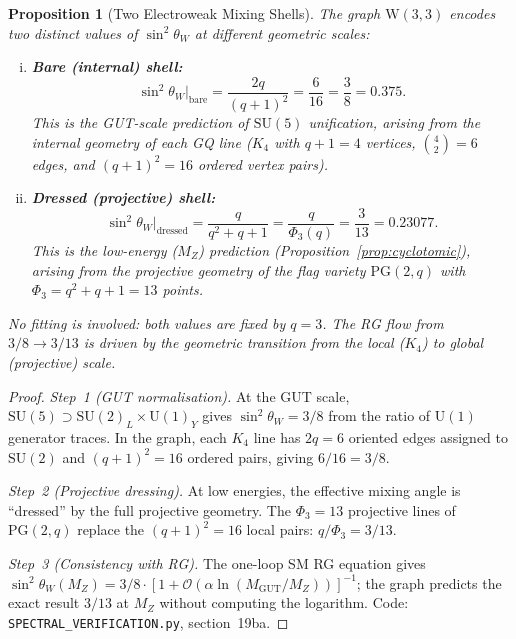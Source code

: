 \documentclass[12pt,a4paper]{article}
\newtheorem{proposition}[theorem]{Proposition}
\newcommand{\W}{\mathrm{W}(3,3)}
\begin{document}
\begin{proposition}[Two Electroweak Mixing Shells]\label{prop:ew-shells}
The graph $\W$ encodes \emph{two} distinct values of $\sin^2\theta_W$
at different geometric scales:
\begin{enumerate}[(i)]
  \item \textbf{Bare (internal) shell:}
        \[
          \sin^2\theta_W\big|_{\mathrm{bare}}
          = \frac{2q}{(q+1)^2}
          = \frac{6}{16}
          = \frac{3}{8}
          = 0.375.
        \]
        This is the GUT-scale prediction of $\mathrm{SU}(5)$
        unification, arising from the \emph{internal} geometry of
        each GQ line ($K_4$ with $q+1 = 4$ vertices, $\binom{4}{2} = 6$ edges,
        and $(q+1)^2 = 16$ ordered vertex pairs).
  \item \textbf{Dressed (projective) shell:}
        \[
          \sin^2\theta_W\big|_{\mathrm{dressed}}
          = \frac{q}{q^2 + q + 1}
          = \frac{q}{\Phi_3(q)}
          = \frac{3}{13}
          = 0.23077.
        \]
        This is the low-energy ($M_Z$) prediction
        (Proposition~\ref{prop:cyclotomic}), arising from the
        \emph{projective} geometry of the flag variety
        $\mathrm{PG}(2,q)$ with $\Phi_3 = q^2+q+1 = 13$ points.
\end{enumerate}
No fitting is involved: both values are fixed by $q = 3$.
The RG flow from $3/8 \to 3/13$ is driven by the geometric
transition from the local ($K_4$) to global (projective) scale.
\end{proposition}

\begin{proof}
\emph{Step~1 (GUT normalisation).}
At the GUT scale, $\mathrm{SU}(5) \supset \mathrm{SU}(2)_L \times \mathrm{U}(1)_Y$
gives $\sin^2\theta_W = 3/8$ from the ratio of $\mathrm{U}(1)$
generator traces.  In the graph, each $K_4$ line has $2q = 6$
oriented edges assigned to $\mathrm{SU}(2)$ and $(q+1)^2 = 16$
ordered pairs, giving $6/16 = 3/8$.

\emph{Step~2 (Projective dressing).}
At low energies, the effective mixing angle is ``dressed'' by
the full projective geometry.  The $\Phi_3 = 13$ projective lines
of $\mathrm{PG}(2,q)$ replace the $(q+1)^2 = 16$ local pairs:
$q/\Phi_3 = 3/13$.

\emph{Step~3 (Consistency with RG).}
The one-loop SM RG equation gives
$\sin^2\theta_W(M_Z) = 3/8 \cdot [1 + \mathcal{O}(\alpha\ln(M_{\mathrm{GUT}}/M_Z))]^{-1}$;
the graph predicts the exact result $3/13$ at $M_Z$ without
computing the logarithm.
Code: \texttt{SPECTRAL\_VERIFICATION.py}, section~19ba.
\end{proof}
\end{document}
